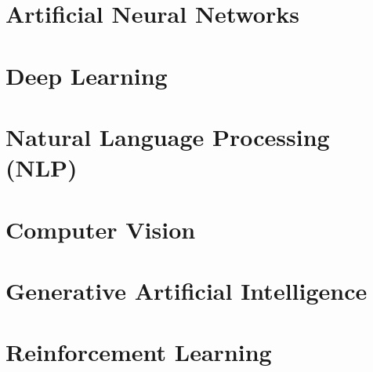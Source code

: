 \documentclass[a4paper]{book}
\begin{document}
\chapter{Artificial Neural Networks}
\label{ch:neural-networks}
\framedtext{\color{red}{TODO:}}
\chapter{Deep Learning}
\label{ch:deep-learning}
\framedtext{\color{red}{TODO:}}
\chapter{Natural Language Processing (NLP)}
\label{ch:nlp}
\framedtext{\color{red}{TODO:}}
\chapter{Computer Vision}
\label{ch:computer-vision}
\framedtext{\color{red}{TODO:}}
\chapter{Generative Artificial Intelligence}
\label{ch:generative-ai}
\framedtext{\color{red}{TODO:}}
\chapter{Reinforcement Learning}
\label{ch:reinforcement-learning}
\framedtext{\color{red}{TODO:}}






\end{document}
